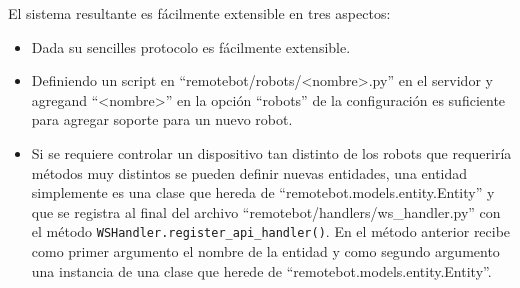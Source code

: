 El sistema resultante es fácilmente extensible en tres aspectos:
\begin{itemize}
    \item Dada su sencilles protocolo es fácilmente extensible.
    \item Definiendo un script en ``remotebot/robots/<nombre>.py''
en el servidor y agregand ``<nombre>'' en la opción ``robots''
de la configuración es suficiente para agregar soporte
para un nuevo robot.
    \item Si se requiere controlar un dispositivo tan distinto de los
        robots que requeriría métodos muy distintos se pueden definir
        nuevas entidades, una entidad simplemente es una clase que
        hereda de ``remotebot.models.entity.Entity'' y que se
        registra al final del archivo ``remotebot/handlers/ws\_handler.py''
        con el método \texttt{WSHandler.register\_api\_handler()}.
        En el método anterior recibe como primer argumento el
        nombre de la entidad y como segundo argumento una instancia
        de una clase que herede de ``remotebot.models.entity.Entity''.
\end{itemize}
